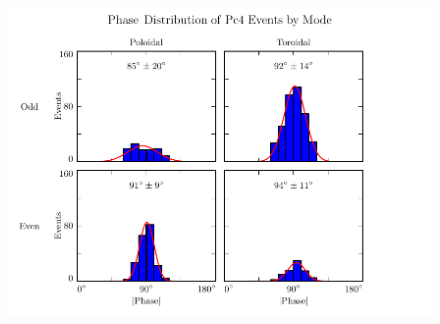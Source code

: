 
\begin{figure}[!htb]
    \centering
    \includegraphics[width=\textwidth]{figures/phase.pdf}
    \caption[Phase Distribution of Pc4 Events by Mode]{
      \todo{$\cdots$}
    }
    \label{fig_phase}
\end{figure}


